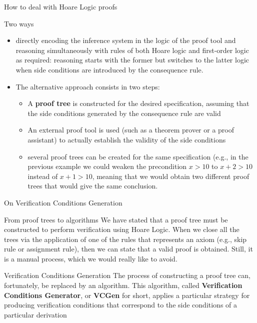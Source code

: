 \documentclass[aspectratio=169]{beamer}
\begin{document}
\begin{slide}{How to deal with Hoare Logic proofs}
  \begin{block}{Two ways}
  \begin{itemize}
    \item directly encoding the inference system in the logic of the proof tool and reasoning simultaneously with rules of both Hoare logic and first-order logic as required: reasoning starts with the former but switches to the latter logic when side conditions are introduced by the consequence rule.
    \item The alternative approach consists in two steps:
      \begin{itemize}
        \item A \textbf{proof tree} is constructed for the desired specification, assuming that the side conditions generated by the consequence rule are valid
        \item An external proof tool is used (such as a theorem prover or a proof assistant) to actually establish the validity of the side conditions
        \item several proof trees can be created for the same specification (e.g., in the previous example we could weaken the precondition $x > 10$ to $x + 2 > 10$ instead of $x + 1 > 10$, meaning that we would obtain two different proof trees that would give the same conclusion.
      \end{itemize}
  \end{itemize}
  \end{block}
\end{slide}

\begin{slide}{On Verification Conditions Generation}
\begin{block}{From proof trees to algorithms}
  We have stated that a proof tree must be constructed to perform verification using Hoare Logic. When we close all the trees via the application of one of the rules that represents an axiom (e.g., skip rule or assignment rule), then we can state that a valid proof is obtained. Still, it is a manual process, which we would really like to avoid.
\end{block}

\begin{block}{Verification Conditions Generation}
The process of constructing a proof tree can, fortunately, be replaced by an algorithm. This algorithm, called \textbf{Verification Conditions Generator}, or \textbf{VCGen} for short, applies a particular strategy for producing verification conditions that correspond to the side conditions of a particular derivation  
\end{block}

\end{slide}
\end{document}
